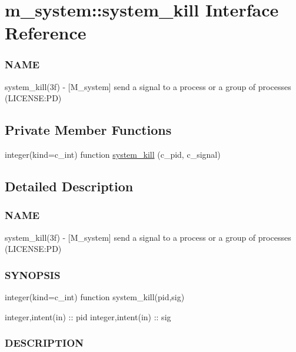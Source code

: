 \hypertarget{interfacem__system_1_1system__kill}{}\section{m\+\_\+system\+:\+:system\+\_\+kill Interface Reference}
\label{interfacem__system_1_1system__kill}


\subsubsection*{N\+A\+ME}

system\+\_\+kill(3f) -\/ \mbox{[}M\+\_\+system\mbox{]} send a signal to a process or a group of processes (L\+I\+C\+E\+N\+SE\+:PD)  


\subsection*{Private Member Functions}
\begin{DoxyCompactItemize}
\item 
integer(kind=c\+\_\+int) function \mbox{\hyperlink{interfacem__system_1_1system__kill_a79ff46722f540f931d947f90bdf2c8ea}{system\+\_\+kill}} (c\+\_\+pid, c\+\_\+signal)
\end{DoxyCompactItemize}


\subsection{Detailed Description}
\subsubsection*{N\+A\+ME}

system\+\_\+kill(3f) -\/ \mbox{[}M\+\_\+system\mbox{]} send a signal to a process or a group of processes (L\+I\+C\+E\+N\+SE\+:PD) 

\subsubsection*{S\+Y\+N\+O\+P\+S\+IS}

\begin{DoxyVerb}integer(kind=c_int) function system_kill(pid,sig)

   integer,intent(in) :: pid
   integer,intent(in) :: sig
\end{DoxyVerb}


\subsubsection*{D\+E\+S\+C\+R\+I\+P\+T\+I\+ON}

